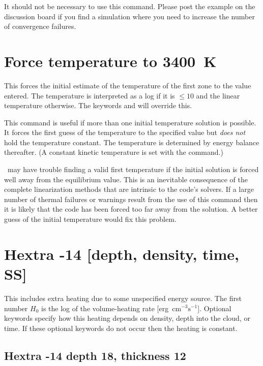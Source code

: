 It should not be necessary to use this command.
Please post the example
on the discussion board if you find a simulation where you need to
increase the number of convergence failures.

\section{Force temperature to 3400~K}

This forces the initial estimate of the temperature of the first zone
to the value entered.  The temperature is interpreted as a log if it is
$\le 10$ and the linear temperature otherwise.
The keywords  and  will override this.

This command is useful if more than one initial temperature solution
is possible.
It forces the first guess of the temperature to the specified
value but \emph{does not} hold the temperature constant.
The temperature is
determined by energy balance thereafter.
(A constant kinetic temperature
is set with the  command.)

\Cloudy\ may have trouble finding a valid first temperature if the initial
solution is forced well away from the equilibrium value.
This is an
inevitable consequence of the complete linearization methods that are
intrinsic to the code's solvers.
If a large number of thermal failures
or warnings result from the use of this command then it is likely that the
code has been forced too far away from the solution.
A better guess of
the initial temperature would fix this problem.

\section{Hextra -14 [depth, density, time, SS]}

This includes extra heating due to some unspecified energy source.
The
first number $H_0$ is the log of the volume-heating rate
[erg~cm$^{-3}\mathrm{s}^{-1}$].
Optional keywords specify how this heating depends on density,
depth into the cloud, or time.
If these optional keywords do not occur then the heating
is constant.

\subsection{Hextra -14 depth 18, thickness 12}


